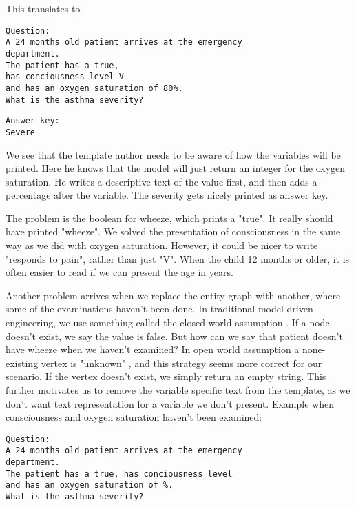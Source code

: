 This translates to 
\begin{lstlisting}[caption={Question instantiation}, frame=single] 
Question:
A 24 months old patient arrives at the emergency 
department. 
The patient has a true,
has conciousness level V 
and has an oxygen saturation of 80%. 
What is the asthma severity? 
\end{lstlisting}
 \begin{lstlisting}[caption={Answer key template}, frame=single] 
Answer key:
Severe
\end{lstlisting}

We see that the template author needs to be aware of how the variables will be printed. Here he knows that the model will just return an integer for the oxygen saturation. He writes a descriptive text of the value first, and then adds a percentage after the variable. The severity gets nicely printed as answer key.

The problem is the boolean for wheeze, which prints a "true". It really should have printed "wheeze". We solved the presentation of consciousness in the same way as we did with oxygen saturation. However, it could be nicer to write "responds to pain", rather than just "V". When the child 12 months or older, it is often easier to read if we can present the age in years.

Another problem arrives when we replace the entity graph with another, where some of the examinations haven't been done. In traditional model driven engineering, we use something called the closed world assumption \parencite{Sadowska2019}. If a node doesn't exist, we say the value is false. But how can we say that patient doesn't have wheeze when we haven't examined? In open world assumption a none-existing vertex is "unknown" \parencite{Patel-Schneider2006} \parencite{Bergman2018}, and this strategy seems more correct for our scenario. If the vertex doesn't exist, we simply return an empty string. This further motivates us to remove the variable specific text from the template, as we don't want text representation for a variable we don't present. Example when consciousness and oxygen saturation haven't been examined:

\begin{lstlisting}[caption={Question instantiation}, frame=single] 
Question:
A 24 months old patient arrives at the emergency 
department. 
The patient has a true, has conciousness level 
and has an oxygen saturation of %. 
What is the asthma severity? 
\end{lstlisting}

